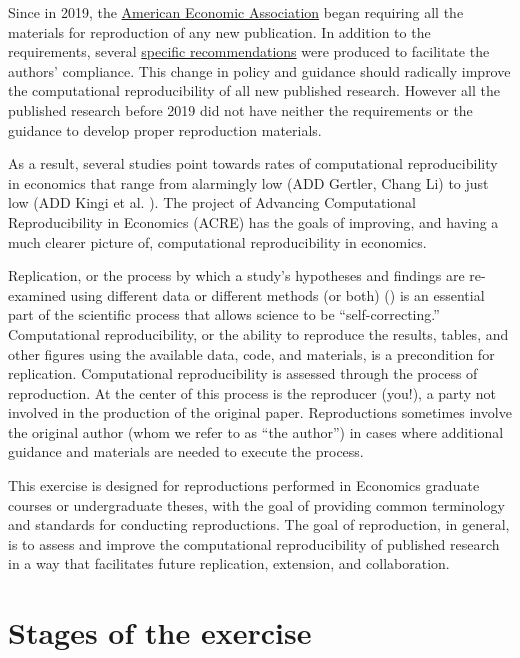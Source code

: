 \documentclass[]{book}
\begin{document}
Since in 2019, the \href{https://www.aeaweb.org/journals/policies/data-code/}{American Economic Association} began requiring all the materials for reproduction of any new publication. In addition to the requirements, several \href{https://aeadataeditor.github.io/aea-de-guidance/}{specific recommendations} were produced to facilitate the authors' compliance. This change in policy and guidance should radically improve the computational reproducibility of all new published research. However all the published research before 2019 did not have neither the requirements or the guidance to develop proper reproduction materials.

As a result, several studies point towards rates of computational reproducibility in economics that range from alarmingly low (ADD Gertler, Chang Li) to just low (ADD Kingi et al. ). The project of Advancing Computational Reproducibility in Economics (ACRE) has the goals of improving, and having a much clearer picture of, computational reproducibility in economics.

Replication, or the process by which a study's hypotheses and findings are re-examined using different data or different methods (or both) (\citet{King95}) is an essential part of the scientific process that allows science to be ``self-correcting.'' Computational reproducibility, or the ability to reproduce the results, tables, and other figures using the available data, code, and materials, is a precondition for replication. Computational reproducibility is assessed through the process of reproduction. At the center of this process is the reproducer (you!), a party not involved in the production of the original paper. Reproductions sometimes involve the original author (whom we refer to as ``the author'') in cases where additional guidance and materials are needed to execute the process.

This exercise is designed for reproductions performed in Economics graduate courses or undergraduate theses, with the goal of providing common terminology and standards for conducting reproductions. The goal of reproduction, in general, is to assess and improve the computational reproducibility of published research in a way that facilitates future replication, extension, and collaboration.

\hypertarget{stages-of-the-exercise}{%
\section{Stages of the exercise}\label{stages-of-the-exercise}}
\end{document}
